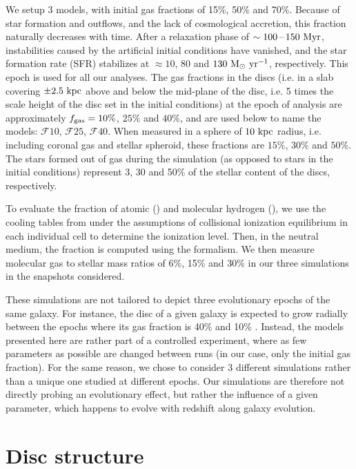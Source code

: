 \documentclass[useAMS,usenatbib]{mnras}
\newcommand{\fgas}{\ensuremath{f_{\rm gas}}\xspace}
\newcommand{\gs}{\ensuremath{\mathcal{F}10}\xspace}
\newcommand{\gm}{\ensuremath{\mathcal{F}25}\xspace}
\newcommand{\gl}{\ensuremath{\mathcal{F}40}\xspace}
\begin{document}
We setup 3 models, with initial gas fractions of 15\%, 50\% and 70\%. Because of star formation and outflows, and the lack of cosmological accretion, this fraction naturally decreases with time. After a relaxation phase of $\sim 100 \textrm{\,--\,} 150 \mathrm{~Myr}$, instabilities caused by the artificial initial conditions have vanished, and the star formation rate (SFR) stabilizes at $\approx 10$, 80 and $130 \mathrm{~M}_{\odot}\mathrm{~yr}^{-1}$, respectively. This epoch is used for all our analyses. The gas fractions in the discs (i.e. in a slab covering $\pm 2.5 \mathrm{~kpc}$ above and below the mid-plane of the disc, i.e. 5 times the scale height of the disc set in the initial conditions) at the epoch of analysis are approximately $\fgas = 10\%$, $25\%$ and $40\%$, and are used below to name the models: \gs, \gm, \gl. When measured in a sphere of $10 \mathrm{~kpc}$ radius, i.e. including coronal gas and stellar spheroid, these fractions are $15\%$, $30\%$ and $50\%$. The stars formed out of gas during the simulation (as opposed to stars in the initial conditions) represent 3, 30 and 50\% of the stellar content of the discs, respectively.

To evaluate the fraction of atomic (\hi) and molecular hydrogen (\htwo), we use the cooling tables from \ramses under the assumptions of collisional ionization equilibrium in each individual cell to determine the ionization level. Then, in the neutral medium, the \htwo fraction is computed using the \citet{Krumholz2009} formalism. We then measure molecular gas to stellar mass ratios of 6\%, 15\% and 30\% in our three simulations in the snapshots considered.

These simulations are not tailored to depict three evolutionary epochs of the same galaxy. For instance, the disc of a given galaxy is expected to grow radially between the epochs where its gas fraction is 40\% and 10\% \citep{Kretschmer2020, Agertz2021}. Instead, the models presented here are rather part of a controlled experiment, where as few parameters as possible are changed between runs (in our case, only the initial gas fraction). For the same reason, we chose to consider 3 different simulations rather than a unique one studied at different epochs. Our simulations are therefore not directly probing an evolutionary effect, but rather the influence of a given parameter, which happens to evolve with redshift along galaxy evolution.

\section{Disc structure}
\label{sec:structure}
\end{document}
